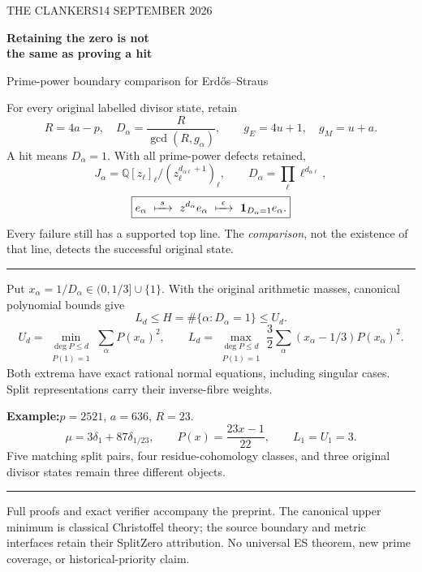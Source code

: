 \documentclass[11pt]{article}
\begin{document}
\noindent\small THE CLANKERS\hfill14 SEPTEMBER 2026
\vspace{3mm}
\begin{center}
{\LARGE\bfseries Retaining the zero is not\\[2mm] the same as proving a hit}\par
\vspace{3mm}
{\large Prime-power boundary comparison for Erd\H{o}s--Straus}
\end{center}
\noindent For every original labelled divisor state, retain
\[
 R=4a-p,\quad D_\alpha=\frac R{\gcd(R,g_\alpha)},\qquad
 g_E=4u+1,\quad g_M=u+a.
\]
A hit means $D_\alpha=1$. With all prime-power defects retained,
\[
 J_\alpha=\mathbb Q[z_\ell]_\ell/
       (z_\ell^{d_{\alpha\ell}+1})_\ell,\qquad
 D_\alpha=\prod_\ell\ell^{d_{\alpha\ell}},
\]
\[
 \boxed{e_\alpha\ \xmapsto{\ s\ }\ z^{d_\alpha}e_\alpha
 \ \xmapsto{\ \epsilon\ }\ \mathbf1_{D_\alpha=1}e_\alpha.}
\]
Every failure still has a supported top line. The \emph{comparison}, not the
existence of that line, detects the successful original state.

\vspace{3mm}\hrule\vspace{3mm}
\noindent Put $x_\alpha=1/D_\alpha\in(0,1/3]\cup\{1\}$. With the original
arithmetic masses, canonical polynomial bounds give
\[
 \boxed{L_d\le H=\#\{\alpha:D_\alpha=1\}\le U_d.}
\]
\[
 U_d=\min_{\substack{\deg P\le d\\P(1)=1}}\sum_\alpha P(x_\alpha)^2,
 \qquad
 L_d=\max_{\substack{\deg P\le d\\P(1)=1}}
 \frac32\sum_\alpha(x_\alpha-1/3)P(x_\alpha)^2.
\]
\noindent Both extrema have exact rational normal equations, including singular
cases. Split representations carry their inverse-fibre weights.

\vspace{2mm}
\noindent\textbf{Example:}\quad $p=2521$, $a=636$, $R=23$.
\[
 \mu=3\delta_1+87\delta_{1/23},\qquad
 P(x)=\frac{23x-1}{22},\qquad L_1=U_1=3.
\]
\noindent\small Five matching split pairs, four residue-cohomology classes,
and three original divisor states remain three different objects.

\vspace{3mm}\hrule\vspace{2mm}
\noindent\footnotesize
Full proofs and exact verifier accompany the preprint.
The canonical upper minimum is classical Christoffel theory; the source
boundary and metric interfaces retain their SplitZero attribution.
No universal ES theorem, new prime coverage, or historical-priority claim.
\end{document}

